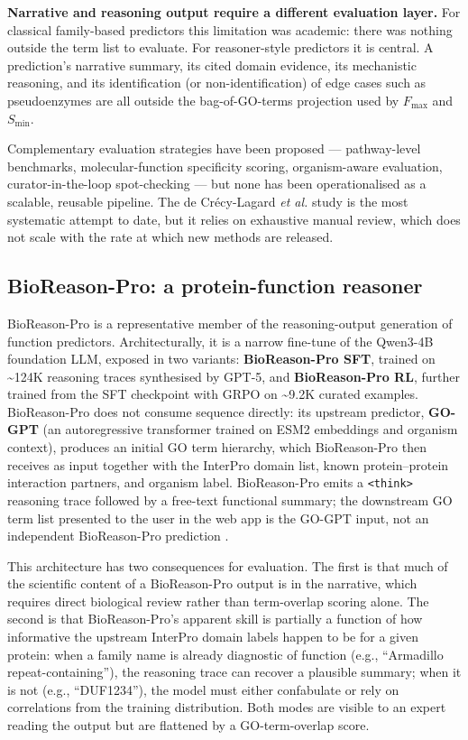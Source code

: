\documentclass[
  11pt,
]{article}
\begin{document}
\textbf{Narrative and reasoning output require a different evaluation
layer.} For classical family-based predictors this limitation was
academic: there was nothing outside the term list to evaluate. For
reasoner-style predictors it is central. A prediction's narrative
summary, its cited domain evidence, its mechanistic reasoning, and its
identification (or non-identification) of edge cases such as
pseudoenzymes are all outside the bag-of-GO-terms projection used by
\(F_{\max}\) and \(S_{\min}\).

Complementary evaluation strategies have been proposed --- pathway-level
benchmarks, molecular-function specificity scoring, organism-aware
evaluation, curator-in-the-loop spot-checking --- but none has been
operationalised as a scalable, reusable pipeline. The de Crécy-Lagard
\emph{et al.} \cite{decrecylagard2025} study is the most systematic attempt to date, but
it relies on exhaustive manual review, which does not scale with the
rate at which new methods are released.

\hypertarget{bioreason-pro-a-protein-function-reasoner}{%
\subsection{BioReason-Pro: a protein-function
reasoner}\label{bioreason-pro-a-protein-function-reasoner}}

BioReason-Pro \cite{fallahpour2026} is a representative member of the
reasoning-output generation of function predictors. Architecturally, it
is a narrow fine-tune of the Qwen3-4B foundation LLM, exposed in two variants:
\textbf{BioReason-Pro SFT}, trained on \textasciitilde124K reasoning
traces synthesised by GPT-5, and \textbf{BioReason-Pro RL}, further
trained from the SFT checkpoint with GRPO on \textasciitilde9.2K curated
examples. BioReason-Pro does not consume sequence directly: its upstream
predictor, \textbf{GO-GPT} (an autoregressive transformer trained on
ESM2 embeddings and organism context), produces an initial GO term
hierarchy, which BioReason-Pro then receives as input together with the
InterPro domain list, known protein--protein interaction partners, and
organism label. BioReason-Pro emits a
\texttt{\textless{}think\textgreater{}} reasoning trace followed by a
free-text functional summary; the downstream GO term list presented to
the user in the web app is the GO-GPT input, not an independent
BioReason-Pro prediction \cite{fallahpour2026}.

This architecture has two consequences for evaluation. The first is that
much of the scientific content of a BioReason-Pro output is in the
narrative, which requires direct biological review rather than
term-overlap scoring alone. The second is that BioReason-Pro's apparent
skill is partially a function of how informative the upstream InterPro
domain labels happen to be for a given protein: when a family name is
already diagnostic of function (e.g., ``Armadillo repeat-containing''),
the reasoning trace can recover a plausible summary; when it is not
(e.g., ``DUF1234''), the model must either confabulate or rely on
correlations from the training distribution. Both modes are visible to
an expert reading the output but are flattened by a GO-term-overlap
score.
\end{document}
